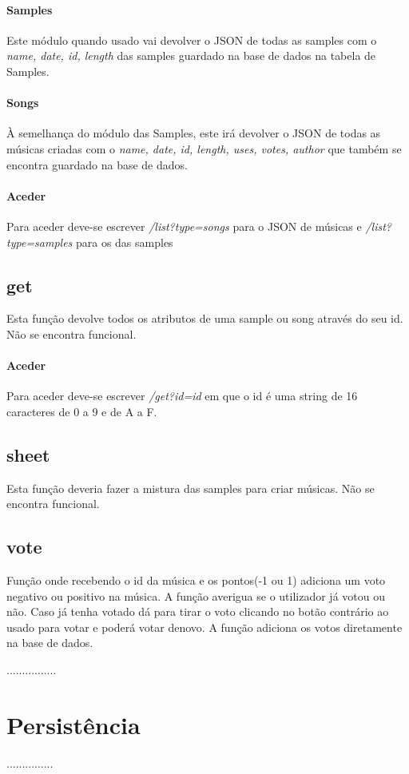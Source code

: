 \documentclass{report}
\begin{document}
\paragraph{Samples}
Este módulo quando usado vai devolver o JSON de todas as samples com o 
\textit{name, date, id, length} das samples guardado na base de dados na tabela de Samples.
\paragraph{Songs}
À semelhança do módulo das Samples, este irá devolver o JSON de todas 
as músicas criadas com o \textit{name, date, id, length, uses, votes, author}
 que também se encontra guardado na base de dados.
 \paragraph{Aceder}
	Para aceder deve-se escrever \textit{/list?type=songs} para o JSON de músicas e \textit{/list?type=samples}
 para os das samples
 \subsection{get}
 Esta função devolve todos os atributos de uma sample ou song através do seu id.
 \p Não se encontra funcional.
 \paragraph{Aceder} 
 Para aceder deve-se escrever \textit{/get?id=id} em que o id é uma string de 16 caracteres de 0 a 9 e de A a F.

 \subsection{sheet}
 Esta função deveria fazer a mistura das samples para criar músicas.
 \p Não se encontra funcional.

 \subsection{vote}
Função onde recebendo o id da música e os pontos(-1 ou 1) adiciona 
um voto negativo ou positivo na música.
A função averigua se o utilizador já votou ou não. Caso já tenha votado
dá para tirar o voto clicando no botão contrário ao usado para votar e
poderá votar denovo.
A função adiciona os votos diretamente na base de dados.

................

\section{Persistência}
\label{chap.persistencia}
...............
\end{document}
